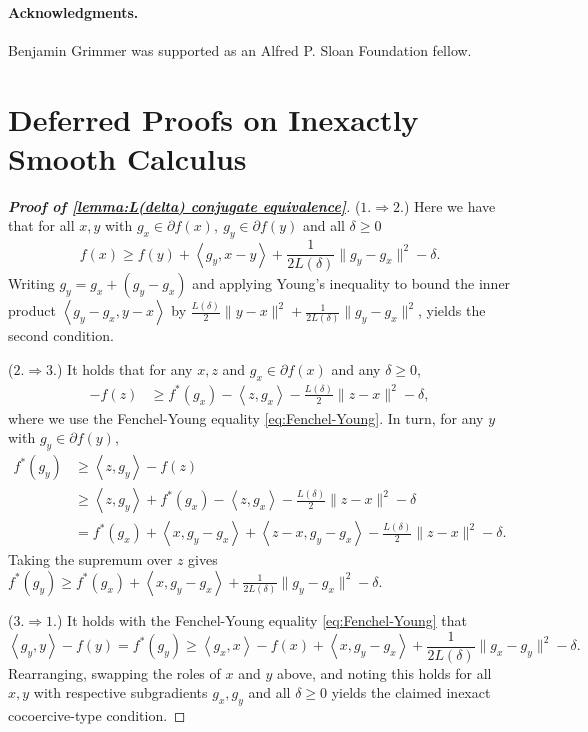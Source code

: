 \documentclass[11pt, hidelinks]{article}
\numberwithin{equation}{section}
\theoremstyle{thmstyletwo}%
\numberwithin{equation}{section}
\newcommand{\inner}[2]{\left\langle {#1}, {#2} \right\rangle}
\begin{document}

%   

  
    \paragraph{Acknowledgments.} Benjamin Grimmer was supported as an Alfred P. Sloan Foundation fellow.
  
  
    {\small
    
    
    }
\appendix


\section{Deferred Proofs on Inexactly Smooth Calculus}\label{sec: appendix L(delta) calc}

\begin{proof}[\bf Proof of \cref{lemma:L(delta) conjugate equivalence}]
($1. \Longrightarrow 2.$) Here we have that for all $x, y$ with $g_x \in \partial f(x), \ g_y \in \partial f(y)$ and all $\delta \geq 0$ $$f(x) \geq f(y) + \inner{g_y}{x-y}+\frac{1}{2L(\delta)}\|g_y-g_x\|^2 -\delta .$$
Writing $g_y = g_x + (g_y-g_x)$ and applying Young's inequality to bound the inner product $\inner{g_y-g_x}{y-x}$ by $\frac{L(\delta)}{2}\|y-x\|^2 + \frac{1}{2L(\delta)}\|g_y-g_x\|^2$, yields the second condition.

\noindent ($2. \Longrightarrow 3.$)  It holds that for any $x,z$ and $g_x \in \partial f(x)$ and any $\delta \geq 0$, \begin{align*}
    -f(z) &\geq f^*(g_x)-\inner{z}{g_x}-\frac{L(\delta)}{2}\|z-x\|^2-\delta,
\end{align*}
where we use the Fenchel-Young equality \eqref{eq:Fenchel-Young}.
In turn, for any $y$ with $g_y \in \partial f(y)$, \begin{align*}
    f^*(g_y) &\geq \inner{z}{g_y}-f(z)\\
    &\geq \inner{z}{g_y}+f^*(g_x)-\inner{z}{g_x}-\frac{L(\delta)}{2}\|z-x\|^2-\delta\\
    &= f^*(g_x)+\inner{x}{g_y-g_x}+\inner{z-x}{g_y-g_x}-\frac{L(\delta)}{2}\|z-x\|^2-\delta.
\end{align*}
Taking the supremum over $z$ gives $f^*(g_y) \geq f^*(g_x) + \inner{x}{g_y-g_x}+\frac{1}{2L(\delta)}\|g_y-g_x\|^2 -\delta.$

\noindent ($3. \Longrightarrow 1.$) It holds with the Fenchel-Young equality \eqref{eq:Fenchel-Young} that $$\inner{g_y}{y}-f(y) = f^*(g_y) \geq \inner{g_x}{x}-f(x)+\inner{x}{g_y-g_x}+\frac{1}{2L(\delta)}\|g_x-g_y\|^2-\delta .$$
Rearranging, swapping the roles of $x$ and $y$ above, and noting this holds for all $x, y$ with respective subgradients $g_x, g_y$ and all $\delta \geq 0$ yields the claimed inexact cocoercive-type condition. 
\end{proof}
\end{document}
